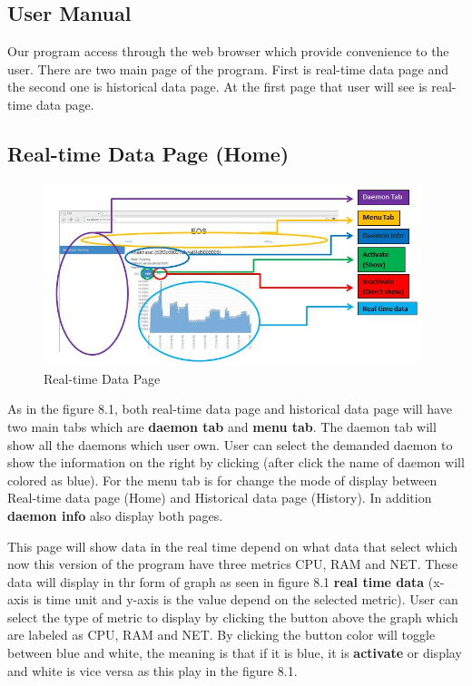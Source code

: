 \documentclass{l3proj}
\begin{document}
\begin{appendices}





\chapter{User Manual}

Our program access through the web browser which provide convenience to the user. There are two main page of the program. First is real-time data page and the second one is historical data page. At the first page that user will see is real-time data page.

\section{Real-time Data Page (Home)}

\begin{figure}[H]
\centering
\includegraphics[width=110mm]{Manual_Images/realtime_data.JPG}
\caption{Real-time Data Page}
\label{fig:Real-time Data Page}
\end{figure}

As in the figure 8.1, both real-time data page and historical data page will have two main tabs which are \textbf{daemon tab} and \textbf{menu tab}. The daemon tab will show all the daemons which user own. User can select the demanded daemon to show the information on the right by clicking (after click the name of daemon will colored as blue). For the menu tab is for change the mode of display between Real-time data page (Home) and Historical data page (History). In addition \textbf{daemon info} also display both pages. 

This page will show data in the real time depend on what data that select which now this version of the program have three metrics CPU, RAM and NET. These data will display in thr form of graph as seen in figure 8.1 \textbf{real time data} (x-axis is time unit and y-axis is the value depend on the selected metric). User can select the type of metric to display by clicking the button above the graph which are labeled as CPU, RAM and NET. By clicking the button color will toggle between blue and white, the meaning is that if it is blue, it is \textbf{activate} or display and white is vice versa as this play in the figure 8.1.


\end{appendices}
\end{document}
